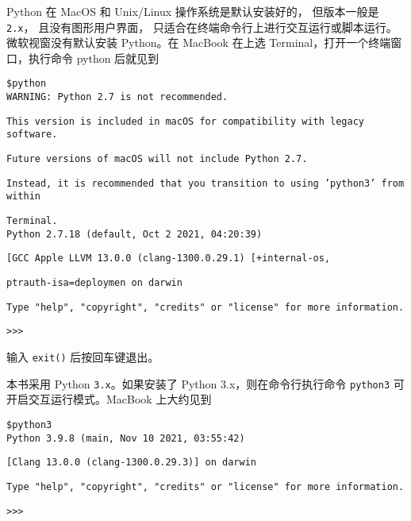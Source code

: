 \documentclass[main.tex]{subfiles}
\begin{document}
Python 在 MacOS 和 Unix/Linux 操作系统是默认安装好的，
但版本一般是 \texttt{2.x}，
且没有图形用户界面，
只适合在终端命令行上进行交互运行或脚本运行。
微软视窗没有默认安装 Python。在 MacBook 在上选 Terminal，打开一个终端窗口，执行命令 python 后就见到\\

\begin{spacing}{0.9}
\noindent\texttt{\$python}\\

\noindent\texttt{WARNING: Python 2.7 is not recommended. }

\noindent\texttt{This version is included in macOS for compatibility with legacy software. }

\noindent\texttt{Future versions of macOS will not include Python 2.7. }

\noindent\texttt{Instead, it is recommended that you transition to using 'python3' from within}

\noindent\texttt{Terminal.}\\

\noindent\texttt{Python 2.7.18 (default, Oct  2 2021, 04:20:39) }

\noindent\texttt{[GCC Apple LLVM 13.0.0 (clang-1300.0.29.1) [+internal-os, }

\noindent\texttt{ptrauth-isa=deploymen on darwin}

\noindent\texttt{Type "help", "copyright", "credits" or "license" for more information.}

\noindent\texttt{>>>} \\
\end{spacing}
\noindent 输入 \texttt{exit()} 后按回车键退出。

本书采用 Python \texttt{3.x}。如果安装了 Python 3.x，则在命令行执行命令 
\texttt{python3} 可开启交互运行模式。MacBook 上大约见到\\
 
\begin{spacing}{0.9}
	\noindent\texttt{\$python3}\\
	
	\noindent\texttt{Python 3.9.8 (main, Nov 10 2021, 03:55:42)  }
	
	\noindent\texttt{[Clang 13.0.0 (clang-1300.0.29.3)] on darwin}

	\noindent\texttt{Type "help", "copyright", "credits" or "license" for more information.}
	
	\noindent\texttt{>>>} \\
\end{spacing} 
\end{document}
